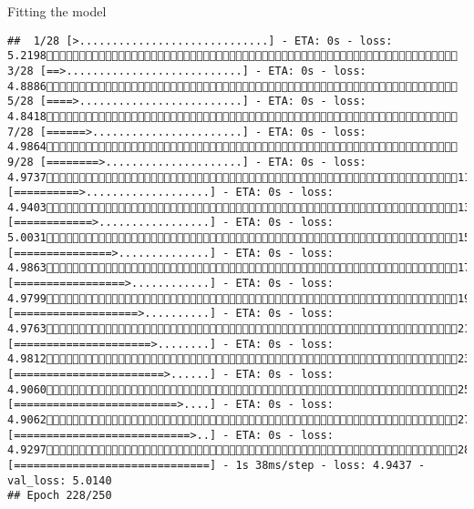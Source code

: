 \documentclass[
  ignorenonframetext,
]{beamer}
\begin{document}
\begin{frame}[fragile]{Fitting the model}
\begin{verbatim}
##  1/28 [>.............................] - ETA: 0s - loss: 5.2198 3/28 [==>...........................] - ETA: 0s - loss: 4.8886 5/28 [====>.........................] - ETA: 0s - loss: 4.8418 7/28 [======>.......................] - ETA: 0s - loss: 4.9864 9/28 [========>.....................] - ETA: 0s - loss: 4.973711/28 [==========>...................] - ETA: 0s - loss: 4.940313/28 [============>.................] - ETA: 0s - loss: 5.003115/28 [===============>..............] - ETA: 0s - loss: 4.986317/28 [=================>............] - ETA: 0s - loss: 4.979919/28 [===================>..........] - ETA: 0s - loss: 4.976321/28 [=====================>........] - ETA: 0s - loss: 4.981223/28 [=======================>......] - ETA: 0s - loss: 4.906025/28 [=========================>....] - ETA: 0s - loss: 4.906227/28 [===========================>..] - ETA: 0s - loss: 4.929728/28 [==============================] - 1s 38ms/step - loss: 4.9437 - val_loss: 5.0140
## Epoch 228/250

\end{verbatim}
\end{frame}
\end{document}
